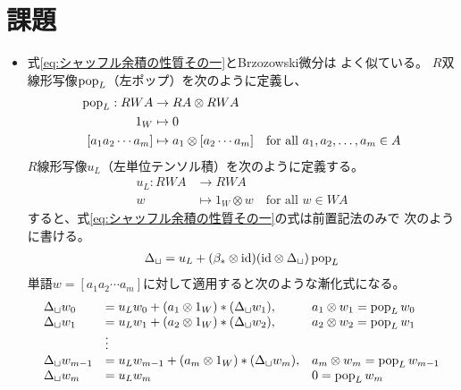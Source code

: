 \section{課題}\label{s1:課題} %
	\begin{itemize}\setlength{\itemsep}{-1mm} %
		\item 式\ref{eq:シャッフル余積の性質その一}とBrzozowski微分は
		よく似ている。
		$R$双線形写像$\operatorname{pop}_L$（左ポップ）を次のように定義し、
		\begin{equation*}\begin{split} %
			\myop{pop}_L: RWA &\to RA\otimes RWA \\
			1_W &\mapsto 0 \\
			[a_1a_2\cdots a_m] &\mapsto a_1\otimes [a_2\cdots a_m]
			\quad\text{for all }a_1,a_2,\dots,a_m\in A
		\end{split}\end{equation*} %
		$R$線形写像$u_L$（左単位テンソル積）を次のように定義する。
		\begin{equation*}\begin{split} %
			u_L: RWA &\to RWA \\
			w &\mapsto 1_W\otimes w \quad\text{for all }w\in WA
		\end{split}\end{equation*} %
		すると、式\ref{eq:シャッフル余積の性質その一}の式は前置記法のみで
		次のように書ける。
		\begin{equation*}\begin{split} %
			\Delta_\sqcup = u_L 
			+ (\beta_*\otimes \myid)(\myid\otimes \Delta_\sqcup)\myop{pop}_L
		\end{split}\end{equation*} %
		単語$w=[a_1a_2\cdots a_m]$に対して適用すると次のような漸化式になる。
		\begin{equation*}\begin{array}{lll} %
			\Delta_\sqcup w_0 
			& = u_Lw_0 + (a_1\otimes 1_W) * (\Delta_\sqcup w_1),
			& a_1\otimes w_1 = \myop{pop}_Lw_0 \\
			\Delta_\sqcup w_1
			& = u_Lw_1 + (a_2\otimes 1_W) * (\Delta_\sqcup w_2),
			& a_2\otimes w_2 = \myop{pop}_Lw_1 \\
			& \vdots \\
			\Delta_\sqcup w_{m-1} 
			& = u_Lw_{m-1} + (a_m\otimes 1_W) * (\Delta_\sqcup w_m),
			& a_m\otimes w_m = \myop{pop}_Lw_{m-1} \\
			\Delta_\sqcup w_m & = u_Lw_m & 0 = \myop{pop}_Lw_m \\

\end{array}
\end{equation*}
\end{itemize}

